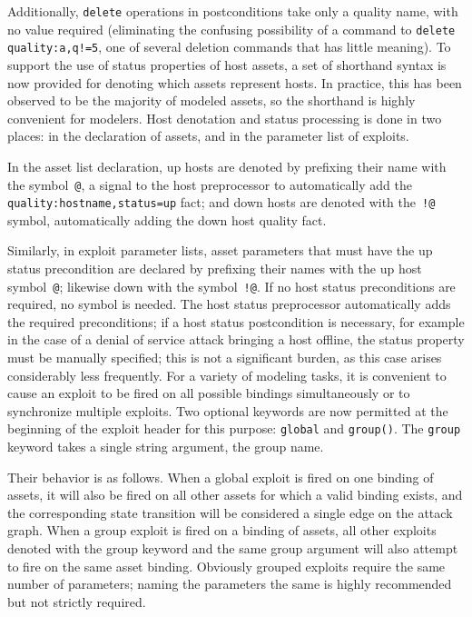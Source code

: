 Additionally, \texttt{delete} operations in postconditions take only a quality
name, with no value required (eliminating the confusing possibility of a
command to \texttt{delete quality:a,q!=5}, one of several deletion commands
that has little meaning).
To support the use of status properties of host assets, a set of shorthand
syntax is now provided for denoting which assets represent hosts. In practice,
this has been observed to be the majority of modeled assets, so the shorthand
is highly convenient for modelers. Host denotation and status processing is 
done in two places: in the declaration of assets, and in the parameter list of 
exploits.

In the asset list declaration, up hosts are denoted by prefixing their name with
the symbol~\texttt{@}, a signal to the host preprocessor to automatically add
the \texttt{quality:hostname,status=up} fact; and down hosts are denoted with
the~\texttt{!@} symbol, automatically adding the down host quality fact.

Similarly, in exploit parameter lists, asset parameters that must have the
up status precondition are declared by prefixing their names with the up host 
symbol~\texttt{@}; likewise down with the symbol~\texttt{!@}. If no host
status preconditions are required, no symbol is needed. The host status
preprocessor automatically adds the required preconditions; if a host status
postcondition is necessary, for example in the case of a denial of service
attack bringing a host offline, the status property must be manually specified;
this is not a significant burden, as this case arises considerably less
frequently.
For a variety of modeling tasks, it is convenient to cause an exploit to be
fired on all possible bindings simultaneously or to synchronize multiple 
exploits. Two optional keywords are now permitted at the beginning
of the exploit header for this purpose: \texttt{global} and \texttt{group()}.
The \texttt{group} keyword takes a single string argument, the group name.

Their behavior
is as follows. When a global exploit is fired on one binding of assets, it will
also be fired on all other assets for which a valid binding exists, and the
corresponding state transition will be considered a single edge on the attack
graph. When a group exploit is fired on a binding of assets, all other exploits
denoted with the group keyword and the same group argument will also attempt
to fire on the same asset binding. Obviously grouped exploits require the same
number of parameters; naming the parameters the same is highly recommended but
not strictly required.

